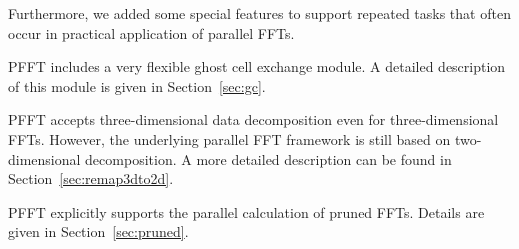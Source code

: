 Furthermore, we added some special features to support repeated tasks that often occur in practical application of parallel FFTs.
\begin{compactitem}
  \item PFFT includes a very flexible ghost cell exchange module. A detailed description of this module is given in Section~\ref{sec:gc}.
  \item PFFT accepts three-dimensional data decomposition even for three-dimen\-sional FFTs.
        However, the underlying parallel FFT framework is still based on two-dimensional decomposition. A more detailed description can be found
        in Section~\ref{sec:remap3dto2d}.
  \item PFFT explicitly supports the parallel calculation of pruned FFTs. Details are given in Section~\ref{sec:pruned}.
\end{compactitem}

